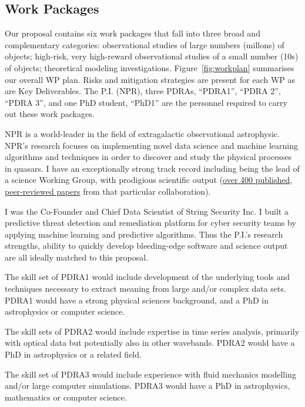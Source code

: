 \subsection{Work Packages}
\smallskip 
\smallskip
\noindent
Our proposal contains six work packages that fall into three broad and
complementary categories: observational studies of large numbers
(millons) of objects; high-risk, very high-reward observational
studies of a small number (10s) of objects; theoretical modeling
investigations. Figure~\ref{fig:workplan} summarises our overall WP
plan. Risks and mitigation strategies are present for each WP as are
Key Deliverables.
The P.I. (NPR), three PDRAs, ``PDRA1'', ``PDRA 2'', ``PDRA 3'', and one PhD
student, ``PhD1'' are the personnel required to carry out these work packages.


\smallskip
\smallskip
\noindent
NPR is a world-leader in the field of extragalactic observational
astrophysic. NPR's research focuses on implementing novel data
science and machine learning algorithms and techniques in order to
discover and study the physical processes in quasars. I have an
exceptionally strong track record including being the lead of a
science Working Group, with prodigious scientific output
(\href{https://tinyurl.com/ycxd8lb6}{over 400 published, peer-reviewed
papers} from that particular collaboration).

\smallskip
\smallskip
\noindent
I was the Co-Founder and Chief Data Scientist of String Security
Inc. I built a predictive threat detection and remediation
platform for cyber security teams by applying machine learning and
predictive algorithms.  Thus the P.I.'s research strengths, ability to
quickly develop bleeding-edge software and science output are all
ideally matched to this proposal.

\smallskip
\smallskip
\noindent
The skill set of PDRA1 would include development of the underlying
tools and techniques necessary to extract meaning from large and/or
complex data sets.  PDRA1 would have a strong physical sciences
background, and a PhD in astrophysics or computer science.

\smallskip
\smallskip
\noindent
The skill sets of PDRA2 would include expertise in time series
analysis, primarily with optical data but potentially also in other
wavebands.  PDRA2 would have a PhD in astrophysics or a related field.

\smallskip
\smallskip
\noindent
The skill set of PDRA3 would include experience with fluid mechanics
modelling and/or large computer simulations.  PDRA3 would have a PhD in astrophysics,
mathematics or computer science.


